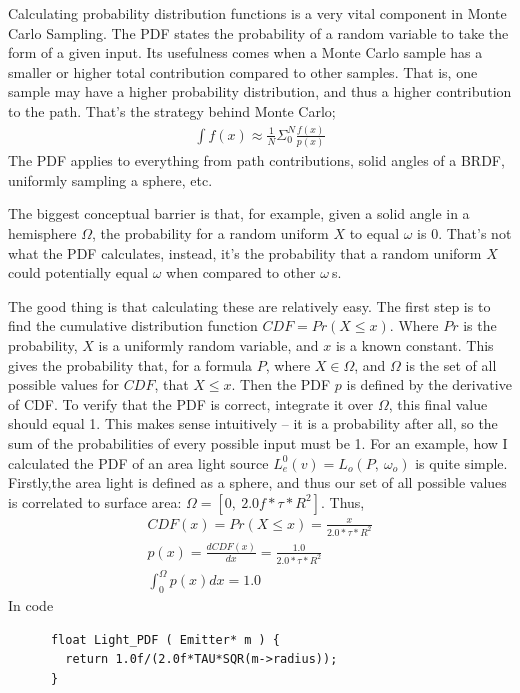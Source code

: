 \documentclass{article}
\begin{document}
    Calculating probability distribution functions is a very vital component in
Monte Carlo Sampling. The PDF states the probability of a random variable to
take the form of a given input. Its usefulness comes when a Monte Carlo
sample has a smaller or higher total contribution compared to other samples.
That is, one sample may have a higher probability distribution, and thus a
higher contribution to the path. That's the strategy behind Monte Carlo;
    \begin{align}
      \int f(x) \approx \frac{1}{N}\Sigma_0^N\frac{f(x)}{p(x)}
    \end{align}
    The PDF applies to everything from path contributions, solid angles of a
    BRDF, uniformly sampling a sphere, etc.
    
    The biggest conceptual barrier is that, for example, given a solid angle in
a hemisphere $\Omega$, the probability for a random uniform $X$ to equal
$\omega$ is 0. That's not what the PDF calculates, instead, it's the probability
that a random uniform $X$ could potentially equal $\omega$ when compared to
other $\omega\:$s.
    

    The good thing is that calculating these are relatively easy. The first step
is to find the cumulative distribution function $CDF = Pr(X \leq x)$. Where $Pr$
is the probability, $X$ is a uniformly random variable, and $x$ is a known
constant. This gives the probability that, for a formula $P$, where $X \in
\Omega$, and $\Omega$ is the set of all possible values for $CDF$, that $X \leq
x$. Then the PDF $p$ is defined by the derivative of CDF. To verify that the PDF
is correct, integrate it over $\Omega$, this final value should equal 1. This
makes sense intuitively -- it is a probability after all, so the sum of the
probabilities of every possible input must be 1. For an example, how I
calculated the PDF of an area light source
      $L^0_e(v) = L_o(P,\:\omega_o)$ 
    is quite simple. Firstly,the area light is defined as a sphere, and thus our
set of all possible values is correlated to surface area:
    $\Omega = [0,\:2.0f*\tau*R^2]$. Thus,
    \begin{align}
      CDF(x) = Pr(X \leq x) = \frac{x}{2.0*\tau*R^2}\\
      p(x) = \frac{dCDF(x)}{dx} = \frac{1.0}{2.0*\tau*R^2}\\
      \int_0^{\Omega}p(x)dx = 1.0
    \end{align}
    In code
    \begin{lstlisting}
      float Light_PDF ( Emitter* m ) {
        return 1.0f/(2.0f*TAU*SQR(m->radius));
      }
    \end{lstlisting}
    
\end{document}

